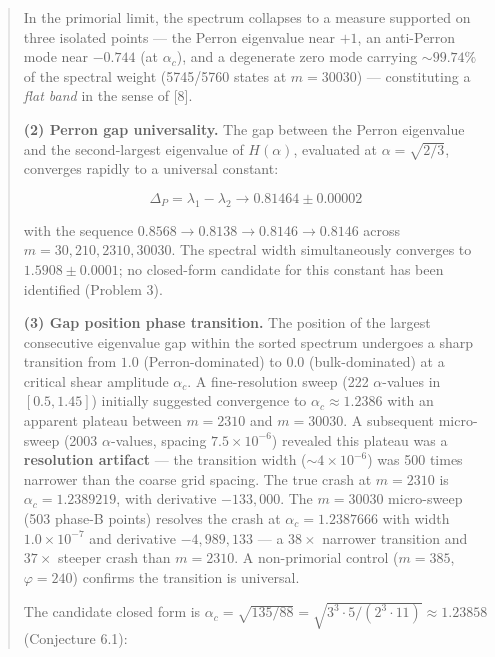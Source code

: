 \documentclass[11pt,letterpaper]{article}
\theoremstyle{definition}
\theoremstyle{remark}
\begin{document}
\begin{abstract}
In the primorial limit, the spectrum collapses to a measure supported on three isolated points --- the Perron eigenvalue near $+1$, an anti-Perron mode near $-0.744$ (at $\alpha_c$), and a degenerate zero mode carrying $\sim 99.74\%$ of the spectral weight (5745/5760 states at $m = 30030$) --- constituting a \emph{flat band} in the sense of [8].

\textbf{(2) Perron gap universality.} The gap between the Perron eigenvalue and the second-largest eigenvalue of $H(\alpha)$, evaluated at $\alpha = \sqrt{2/3}$, converges rapidly to a universal constant:

\[\Delta_P = \lambda_1 - \lambda_2 \longrightarrow 0.81464 \pm 0.00002\]

with the sequence $0.8568 \to 0.8138 \to 0.8146 \to 0.8146$ across $m = 30, 210, 2310, 30030$. The spectral width simultaneously converges to $1.5908 \pm 0.0001$; no closed-form candidate for this constant has been identified (Problem 3).

\textbf{(3) Gap position phase transition.} The position of the largest consecutive eigenvalue gap within the sorted spectrum undergoes a sharp transition from $1.0$ (Perron-dominated) to $0.0$ (bulk-dominated) at a critical shear amplitude $\alpha_c$. A fine-resolution sweep (222 $\alpha$-values in $[0.5, 1.45]$) initially suggested convergence to $\alpha_c \approx 1.2386$ with an apparent plateau between $m = 2310$ and $m = 30030$. A subsequent micro-sweep (2003 $\alpha$-values, spacing $7.5 \times 10^{-6}$) revealed this plateau was a \textbf{resolution artifact} --- the transition width ($\sim 4 \times 10^{-6}$) was 500 times narrower than the coarse grid spacing. The true crash at $m = 2310$ is $\alpha_c = 1.2389219$, with derivative $-133{,}000$. The $m = 30030$ micro-sweep (503 phase-B points) resolves the crash at $\alpha_c = 1.2387666$ with width $1.0 \times 10^{-7}$ and derivative $-4{,}989{,}133$ --- a $38\times$ narrower transition and $37\times$ steeper crash than $m = 2310$. A non-primorial control ($m = 385$, $\varphi = 240$) confirms the transition is universal.

The candidate closed form is $\alpha_c = \sqrt{135/88} = \sqrt{3^3 \cdot 5 / (2^3 \cdot 11)} \approx 1.23858$ (Conjecture 6.1):


\end{abstract}
\end{document}
